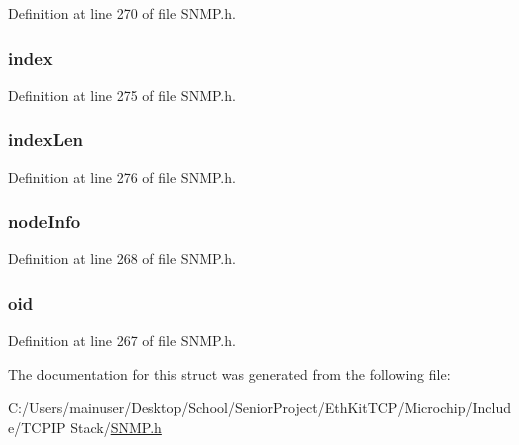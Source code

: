 Definition at line 270 of file S\+N\+M\+P.\+h.

\hypertarget{struct_o_i_d___i_n_f_o_a3e47fb8bc59d325b33374d8f2ab1997d}{}
\subsubsection[{index}]{ index}\label{struct_o_i_d___i_n_f_o_a3e47fb8bc59d325b33374d8f2ab1997d}


Definition at line 275 of file S\+N\+M\+P.\+h.

\hypertarget{struct_o_i_d___i_n_f_o_a3f5785d3d48f99dacd45015c394e44cc}{}
\subsubsection[{index\+Len}]{ index\+Len}\label{struct_o_i_d___i_n_f_o_a3f5785d3d48f99dacd45015c394e44cc}


Definition at line 276 of file S\+N\+M\+P.\+h.

\hypertarget{struct_o_i_d___i_n_f_o_a68384b5cf7ff8ca6b15742deeb84f3a1}{}
\subsubsection[{node\+Info}]{ node\+Info}\label{struct_o_i_d___i_n_f_o_a68384b5cf7ff8ca6b15742deeb84f3a1}


Definition at line 268 of file S\+N\+M\+P.\+h.

\hypertarget{struct_o_i_d___i_n_f_o_a24d9e34929c64d383e961e67f511ab4a}{}
\subsubsection[{oid}]{ oid}\label{struct_o_i_d___i_n_f_o_a24d9e34929c64d383e961e67f511ab4a}


Definition at line 267 of file S\+N\+M\+P.\+h.



The documentation for this struct was generated from the following file\+:\begin{DoxyCompactItemize}
\item 
C\+:/\+Users/mainuser/\+Desktop/\+School/\+Senior\+Project/\+Eth\+Kit\+T\+C\+P/\+Microchip/\+Include/\+T\+C\+P\+I\+P Stack/\hyperlink{_s_n_m_p_8h}{S\+N\+M\+P.\+h}\end{DoxyCompactItemize}

